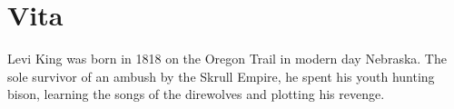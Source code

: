 \chapter*{Vita}

\doublespacing
Levi King was born in 1818 on the Oregon Trail in modern day Nebraska. The sole survivor of an ambush by the Skrull Empire, he spent his youth hunting bison, learning the songs of the direwolves and plotting his revenge.

